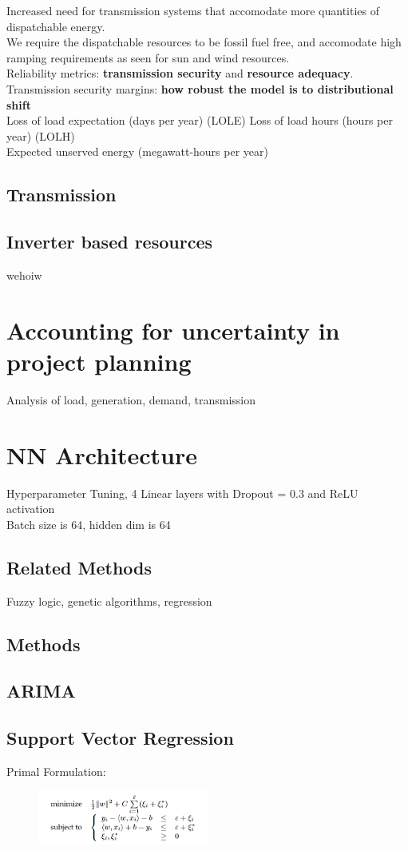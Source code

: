 \documentclass[plain]{article}
\newcommand{\1}{\mathbbm{1}}
\begin{document}
Increased need for transmission systems that accomodate more quantities of dispatchable energy.\\
We require the dispatchable resources to be fossil fuel free, and accomodate high ramping requirements as seen for sun and wind resources.\\
Reliability metrics: \textbf{transmission security} and \textbf{resource adequacy}.\\
Transmission security margins: \textbf{how robust the model is to distributional shift} \\
Loss of load expectation (days per year) (LOLE)
Loss of load hours (hours per year) (LOLH)\\
Expected unserved energy (megawatt-hours per year)\\

\subsection{Transmission}

\subsection{Inverter based resources}
wehoiw
\section{Accounting for uncertainty in project planning}

Analysis of load, generation, demand, transmission

\section{NN Architecture}
Hyperparameter Tuning, 4 Linear layers with Dropout = 0.3 and ReLU activation \\
Batch size is 64, hidden dim is 64
\subsection{Related Methods}
Fuzzy logic, genetic algorithms, regression
\subsection{Methods}
\subsection{ARIMA}
\subsection{Support Vector Regression}
Primal Formulation:
\begin{figure}[H]
	\centering
	\includegraphics[width=0.5\textwidth]{svm_primal.PNG}
	\caption{}
	\label{fig:}
\end{figure}
\end{document}
